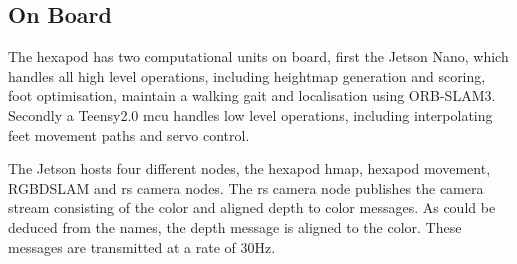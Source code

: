         

    \subsection{On Board} \label{sec:on_board_ros}
        The hexapod has two computational units on board, first the Jetson Nano, which handles all high level operations, including heightmap generation and scoring, foot optimisation, maintain a walking gait and localisation using ORB-SLAM3. Secondly a Teensy2.0 \ac{mcu} handles low level operations, including interpolating feet movement paths and servo control.

        The Jetson hosts four different nodes, the hexapod hmap, hexapod movement, RGBDSLAM and rs camera nodes. The rs camera node publishes the camera stream consisting of the color and aligned depth to color messages. As could be deduced from the names, the depth message is aligned to the color. These messages are transmitted at a rate of 30Hz.
        
